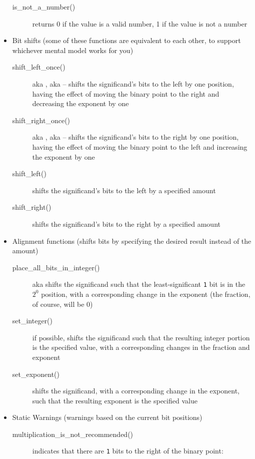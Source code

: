 \begin{itemize}
\begin{description}
        \item[is\_not\_a\_number()] returns 0 if the value is a valid number, 1 if the value is not a number
    \end{description}
    \item Bit shifts (some of these functions are equivalent to each other, to support whichever mental model works for you)
    \begin{description}
        \item[shift\_left\_once()] aka , aka  -- shifts the significand's bits to the left by one position, having the effect of moving the binary point to the right and decreasing the exponent by one
        \item[shift\_right\_once()] aka , aka  -- shifts the significand's bits to the right by one position, having the effect of moving the binary point to the left and increasing the exponent by one
        \item[shift\_left()] shifts the significand's bits to the left by a specified amount
        \item[shift\_right()] shifts the significand's bits to the right by a specified amount
    \end{description}
    \item Alignment functions (shifts bits by specifying the desired result instead of the amount)
    \begin{description}
        \item[place\_all\_bits\_in\_integer()] aka  shifts the significand such that the least-significant \lstinline{1} bit is in the $2^0$ position, with a corresponding change in the exponent (the fraction, of course, will be 0)
        \item[set\_integer()] if possible, shifts the significand such that the resulting integer portion is the specified value, with a corresponding changes in the fraction and exponent
        \item[set\_exponent()] shifts the significand, with a corresponding change in the exponent, such that the resulting exponent is the specified value
    \end{description}
    \item Static Warnings (warnings based on the current bit positions)
    \begin{description}
        \item[multiplication\_is\_not\_recommended()] indicates that there are \lstinline{1} bits to the right of the binary point:

\end{description}
\end{itemize}
